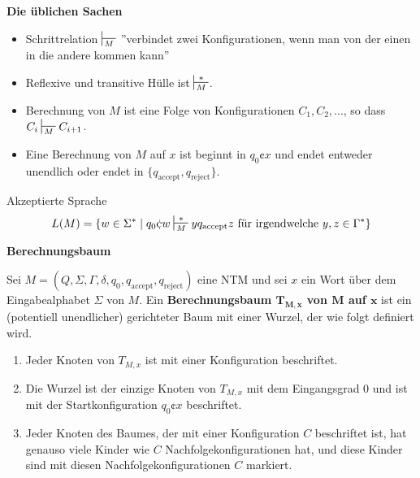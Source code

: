             \textbf{Die üblichen Sachen}
            \begin{itemize}[label=-]
                \item Schrittrelation $\sststile{M}{}$ ''verbindet zwei Konfigurationen, wenn man von der einen in die andere kommen kann''
                \item Reflexive und transitive Hülle ist $\sststile{M}{*}$.
                \item Berechnung von $M$ ist eine Folge von Konfigurationen $C_1, C_2, ...$, so dass $C_i \sststile{M}{} C_{i+1}$.
                \item Eine Berechnung von $M$ auf $x$ ist beginnt in $q_0\cent x$ und endet entweder unendlich oder endet in $\{q_{\text{accept}}, q_{\text{reject}}\}$.
            \end{itemize}
            \begin{mainbox}{Akzeptierte Sprache}
                $$L(M) = \{w \in \Sigma^* \mid q_0\cent w \sststile{M}{*} yq_{\text{accept}}z \text{ für irgendwelche }y,z \in \Gamma^*\}$$
            \end{mainbox}
        
        
        
            \textbf{Berechnungsbaum}
            \begin{mainbox}{}
                Sei $M=  (Q, \Sigma, \Gamma, \delta, q_0, q_{\text{accept}}, q_{\text{reject}})$ eine NTM 
                und sei $x$ ein Wort über dem Eingabealphabet $\Sigma$ von $M$. 
                Ein \textbf{Berechnungsbaum $\mathbf{T_{M, x}}$ von $\mathbf{M}$ auf $\mathbf{x}$} ist ein 
                (potentiell unendlicher) gerichteter Baum mit einer Wurzel, der wie folgt definiert wird.
        
                \begin{enumerate}[label=(\roman*)]
                    \item Jeder Knoten von $T_{M,x}$ ist mit einer Konfiguration beschriftet.
                    \item Die Wurzel ist der einzige Knoten von $T_{M,x}$ mit dem Eingangsgrad $0$ und ist mit der Startkonfiguration $q_0\cent x$ beschriftet.
                    \item Jeder Knoten des Baumes, der mit einer Konfiguration $C$ beschriftet ist, hat genauso viele Kinder wie $C$ Nachfolgekonfigurationen hat, und diese Kinder sind mit diesen Nachfolgekonfigurationen $C$ markiert.
                \end{enumerate}
            \end{mainbox}
        
